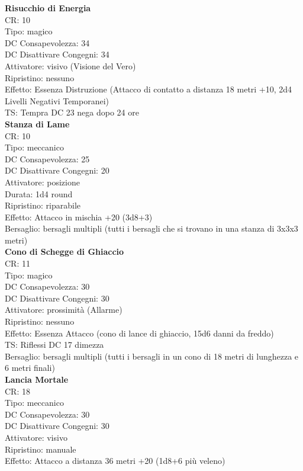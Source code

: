 \documentclass[a4paper,11pt,twoside,openany]{book}
\begin{document}
\begin{multicols}{2}
	\textbf{Risucchio di Energia}\\
	CR: 10 \\
	Tipo: magico \\
	DC Consapevolezza: 34 \\
	DC Disattivare Congegni: 34 \\
	Attivatore: visivo (Visione del Vero) \\
	Ripristino: nessuno \\
	Effetto: Essenza Distruzione (Attacco di contatto a distanza 18 metri +10, 2d4 Livelli Negativi Temporanei) \\
	TS: Tempra DC 23 nega dopo 24 ore\\

	\textbf{Stanza di Lame}\\
	CR: 10 \\
	Tipo: meccanico \\
	DC Consapevolezza: 25 \\
	DC Disattivare Congegni: 20 \\
	Attivatore: posizione \\
	Durata: 1d4 round \\
	Ripristino: riparabile \\
	Effetto: Attacco in mischia +20 (3d8+3) \\
	Bersaglio: bersagli multipli (tutti i bersagli che si trovano in una stanza di 3x3x3 metri)\\

	\textbf{Cono di Schegge di Ghiaccio}\\
	CR: 11 \\
	Tipo: magico \\
	DC Consapevolezza: 30 \\
	DC Disattivare Congegni: 30 \\
	Attivatore: prossimità (Allarme) \\
	Ripristino: nessuno \\
	Effetto: Essenza Attacco (cono di lance di ghiaccio, 15d6 danni da freddo) \\
	TS: Riflessi DC 17 dimezza \\
	Bersaglio: bersagli multipli (tutti i bersagli in un cono di 18 metri di lunghezza e 6 metri finali)\\

	\textbf{Lancia Mortale}\\
	CR: 18 \\
	Tipo: meccanico \\
	DC Consapevolezza: 30 \\
	DC Disattivare Congegni: 30 \\
	Attivatore: visivo\\
	Ripristino: manuale \\
	Effetto: Attacco a distanza 36 metri +20 (1d8+6 più veleno)\\


\end{multicols}
\end{document}
